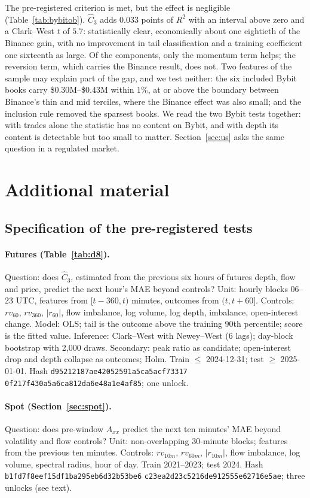 \documentclass[12pt]{article}
\theoremstyle{definition}
\theoremstyle{remark}
\begin{document}
The pre-registered criterion is met, but the effect is negligible (Table~\ref{tab:bybitob}). $\hat C_3$ adds $0.033$ points of $R^2$ with an interval above zero and a Clark--West $t$ of $5.7$: statistically clear, economically about one eightieth of the Binance gain, with no improvement in tail classification and a training coefficient one sixteenth as large. Of the components, only the momentum term helps; the reversion term, which carries the Binance result, does not. Two features of the sample may explain part of the gap, and we test neither: the six included Bybit books carry \$0.30M--\$0.43M within 1\%, at or above the boundary between Binance's thin and mid terciles, where the Binance effect was also small; and the inclusion rule removed the sparsest books. We read the two Bybit tests together: with trades alone the statistic has no content on Bybit, and with depth its content is detectable but too small to matter. Section~\ref{sec:us} asks the same question in a regulated market.

\section{Additional material}\label{app:ia}

\subsection{Specification of the pre-registered tests}
\paragraph{Futures (Table~\ref{tab:d8}).} Question: does $\hat C_3$, estimated from the previous six hours of futures depth, flow and price, predict the next hour's MAE beyond controls? Unit: hourly blocks 06--23 UTC, features from $[t-360,t)$ minutes, outcomes from $(t,t+60]$. Controls: $rv_{60}$, $rv_{360}$, $|r_{60}|$, flow imbalance, log volume, log depth, imbalance, open-interest change. Model: OLS; tail is the outcome above the training 90th percentile; score is the fitted value. Inference: Clark--West with Newey--West (6 lags); day-block bootstrap with 2,000 draws. Secondary: peak ratio as candidate; open-interest drop and depth collapse as outcomes; Holm. Train $\le$ 2024-12-31; test $\ge$ 2025-01-01. Hash \texttt{d95212187ae42052591a5ca5acf73317} \texttt{0f217f430a5a6ca812da6e48a1e4af85}; one unlock.

\paragraph{Spot (Section~\ref{sec:spot}).} Question: does pre-window $A_{xx}$ predict the next ten minutes' MAE beyond volatility and flow controls? Unit: non-overlapping 30-minute blocks; features from the previous ten minutes. Controls: $rv_{10m}$, $rv_{60m}$, $|r_{10m}|$, flow imbalance, log volume, spectral radius, hour of day. Train 2021--2023; test 2024. Hash \texttt{b1fd7f8eef15df1ba295eb6d32b53be6} \texttt{c23ea2d23c5216de912555e62716e5ae}; three unlocks (see text).
\end{document}
